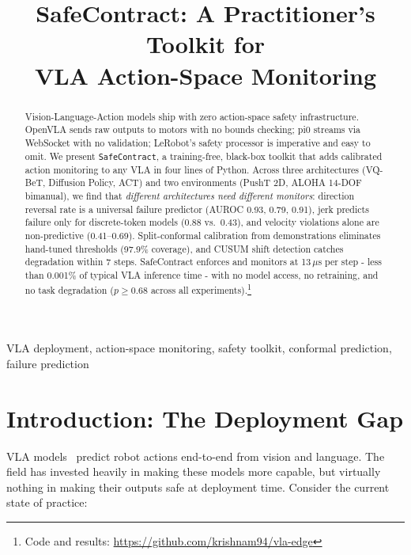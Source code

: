 \documentclass[conference]{IEEEtran}
\begin{document}
\title{SafeContract: A Practitioner's Toolkit for\\VLA Action-Space Monitoring}

\author{
}

\maketitle

\begin{abstract}
Vision-Language-Action models ship with zero action-space safety infrastructure.
OpenVLA sends raw outputs to motors with no bounds checking; pi0 streams via WebSocket with no validation; LeRobot's safety processor is imperative and easy to omit.
We present \texttt{SafeContract}, a training-free, black-box toolkit that adds calibrated action monitoring to any VLA in four lines of Python.
Across three architectures (VQ-BeT, Diffusion Policy, ACT) and two environments (PushT 2D, ALOHA 14-DOF bimanual), we find that \emph{different architectures need different monitors}: direction reversal rate is a universal failure predictor (AUROC 0.93, 0.79, 0.91), jerk predicts failure only for discrete-token models (0.88 vs.\ 0.43), and velocity violations alone are non-predictive (0.41--0.69).
Split-conformal calibration from demonstrations eliminates hand-tuned thresholds (97.9\% coverage), and CUSUM shift detection catches degradation within 7 steps.
SafeContract enforces and monitors at 13\,$\mu$s per step - less than 0.001\% of typical VLA inference time - with no model access, no retraining, and no task degradation ($p \ge 0.68$ across all experiments).\footnote{Code and results: \url{https://github.com/krishnam94/vla-edge}}
\end{abstract}

\begin{IEEEkeywords}
VLA deployment, action-space monitoring, safety toolkit, conformal prediction, failure prediction
\end{IEEEkeywords}

\section{Introduction: The Deployment Gap}

VLA models~\cite{openvla,smolvla} predict robot actions end-to-end from vision and language.
The field has invested heavily in making these models more capable, but virtually nothing in making their outputs safe at deployment time.
Consider the current state of practice:
\end{document}
